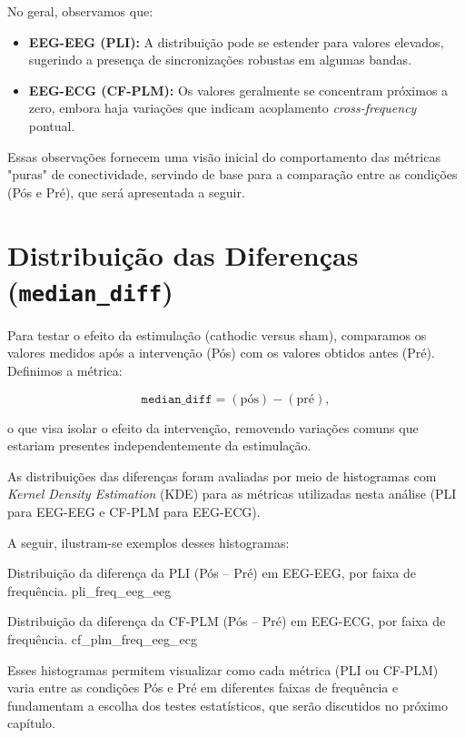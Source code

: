 No geral, observamos que:
\begin{itemize}
    \item \textbf{EEG-EEG (PLI):} A distribuição pode se estender para valores elevados, sugerindo a presença de sincronizações robustas em algumas bandas.
    \item \textbf{EEG-ECG (CF-PLM):} Os valores geralmente se concentram próximos a zero, embora haja variações que indicam acoplamento \emph{cross-frequency} pontual.
\end{itemize}

Essas observações fornecem uma visão inicial do comportamento das métricas "puras" de conectividade, servindo de base para a comparação entre as condições (Pós e Pré), que será apresentada a seguir.

\section{Distribuição das Diferenças (\texttt{median\_diff})}

Para testar o efeito da estimulação (cathodic versus sham), comparamos os valores medidos após a intervenção (Pós) com os valores obtidos antes (Pré). Definimos a métrica:

\[
\texttt{median\_diff} = (\text{pós}) - (\text{pré}),
\]

o que visa isolar o efeito da intervenção, removendo variações comuns que estariam presentes independentemente da estimulação.

As distribuições das diferenças foram avaliadas por meio de histogramas com \emph{Kernel Density Estimation} (KDE) para as métricas utilizadas nesta análise (PLI para EEG-EEG e CF-PLM para EEG-ECG).

A seguir, ilustram-se exemplos desses histogramas:

{Distribuição da diferença da PLI (Pós -- Pré) em EEG-EEG, por faixa de frequência.}
{pli_freq_eeg_eeg}

{Distribuição da diferença da CF-PLM (Pós -- Pré) em EEG-ECG, por faixa de frequência.}
{cf_plm_freq_eeg_ecg}

Esses histogramas permitem visualizar como cada métrica (PLI ou CF-PLM) varia entre as condições Pós e Pré em diferentes faixas de frequência e fundamentam a escolha dos testes estatísticos, que serão discutidos no próximo capítulo.
